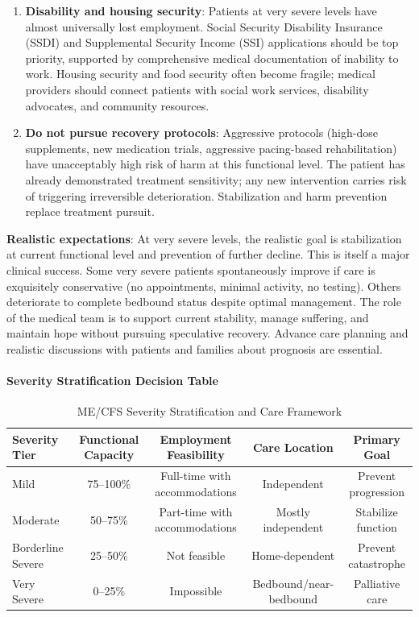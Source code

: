 \begin{enumerate}
    \item \textbf{Disability and housing security}: Patients at very severe levels have almost universally lost employment. Social Security Disability Insurance (SSDI) and Supplemental Security Income (SSI) applications should be top priority, supported by comprehensive medical documentation of inability to work. Housing security and food security often become fragile; medical providers should connect patients with social work services, disability advocates, and community resources.

    \item \textbf{Do not pursue recovery protocols}: Aggressive protocols (high-dose supplements, new medication trials, aggressive pacing-based rehabilitation) have unacceptably high risk of harm at this functional level. The patient has already demonstrated treatment sensitivity; any new intervention carries risk of triggering irreversible deterioration. Stabilization and harm prevention replace treatment pursuit.
\end{enumerate}

\textbf{Realistic expectations}: At very severe levels, the realistic goal is stabilization at current functional level and prevention of further decline. This is itself a major clinical success. Some very severe patients spontaneously improve if care is exquisitely conservative (no appointments, minimal activity, no testing). Others deteriorate to complete bedbound status despite optimal management. The role of the medical team is to support current stability, manage suffering, and maintain hope without pursuing speculative recovery. Advance care planning and realistic discussions with patients and families about prognosis are essential.

\paragraph{Severity Stratification Decision Table}

\begin{table}[h]
\centering
\small
\begin{tabular}{|l|c|c|c|c|}
\hline
\textbf{Severity Tier} & \textbf{Functional Capacity} & \textbf{Employment Feasibility} & \textbf{Care Location} & \textbf{Primary Goal} \\
\hline
Mild & 75--100\% & Full-time with accommodations & Independent & Prevent progression \\
\hline
Moderate & 50--75\% & Part-time with accommodations & Mostly independent & Stabilize function \\
\hline
Borderline Severe & 25--50\% & Not feasible & Home-dependent & Prevent catastrophe \\
\hline
Very Severe & 0--25\% & Impossible & Bedbound/near-bedbound & Palliative care \\
\hline
\end{tabular}
\caption{ME/CFS Severity Stratification and Care Framework}
\label{tab:severity-stratification}
\end{table}

